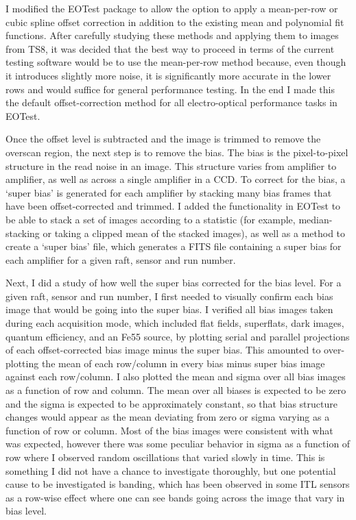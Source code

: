 I modified the EOTest package to allow the option to apply a mean-per-row or cubic spline offset correction in addition to the existing mean and polynomial fit functions. After carefully studying these methods and applying them to images from TS8, it was decided that the best way to proceed in terms of the current testing software would be to use the mean-per-row method because, even though it introduces slightly more noise, it is significantly more accurate in the lower rows and would suffice for general performance testing. In the end I made this the default offset-correction method for all electro-optical performance tasks in EOTest.

Once the offset level is subtracted and the image is trimmed to remove the overscan region, the next step is to remove the bias. The bias is the pixel-to-pixel structure in the read noise in an image. This structure varies from amplifier to amplifier, as well as across a single amplifier in a CCD. To correct for the bias, a ‘super bias’ is generated for each amplifier by stacking many bias frames that have been offset-corrected and trimmed. I added the functionality in EOTest to be able to stack a set of images according to a statistic (for example, median-stacking or taking a clipped mean of the stacked images), as well as a method to create a ‘super bias’ file, which generates a FITS file containing a super bias for each amplifier for a given raft, sensor and run number. 

Next, I did a study of how well the super bias corrected for the bias level. For a given raft, sensor and run number, I first needed to visually confirm each bias image that would be going into the super bias. I verified all bias images taken during each acquisition mode, which included flat fields, superflats, dark images, quantum efficiency, and an Fe55 source, by plotting serial and parallel projections of each offset-corrected bias image minus the super bias. This amounted to over-plotting the mean of each row/column in every bias minus super bias image against each row/column. I also plotted the mean and sigma over all bias images as a function of row and column. The mean over all biases is expected to be zero and the sigma is expected to be approximately constant, so that bias structure changes would appear as the mean deviating from zero or sigma varying as a function of row or column. Most of the bias images were consistent with what was expected, however there was some peculiar behavior in sigma as a function of row where I observed random oscillations that varied slowly in time. This is something I did not have a chance to investigate thoroughly, but one potential cause to be investigated is banding, which has been observed in some ITL sensors as a row-wise effect where one can see bands going across the image that vary in bias level. 

